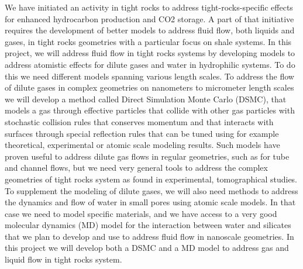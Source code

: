 We have initiated an activity in tight rocks to address tight-rocks-specific effects for enhanced hydrocarbon production and CO2 storage. A part of that initiative requires the development of better models to address fluid flow, both liquids and gases, in tight rocks geometries with a particular focus on shale systems. In this project, we will address fluid flow in tight rocks systems by developing models to address atomistic effects for dilute gases and water in hydrophilic systems. To do this we need different models spanning various length scales. To address the flow of dilute gases in complex geometries on nanometers to micrometer length scales we will develop a method called Direct Simulation Monte Carlo (DSMC), that models a gas through effective particles that collide with other gas particles with stochastic collision rules that conserves momentum and that interacts with surfaces through special reflection rules that can be tuned using for example theoretical, experimental or atomic scale modeling results. Such models have proven useful to address dilute gas flows in regular geometries, such as for tube and channel flows, but we need very general tools to address the complex geometries of tight rocks system as found in experimental, tomographical studies. To supplement the modeling of dilute gases, we will also need methods to address the dynamics and flow of water in small pores using atomic scale models. In that case we need to model specific materials, and we have access to a very good molecular dynamics (MD) model for the interaction between water and silicates that we plan to develop and use to address fluid flow in nanoscale geometries. In this project we will develop both a DSMC and a MD model to address gas and liquid flow in tight rocks system.

